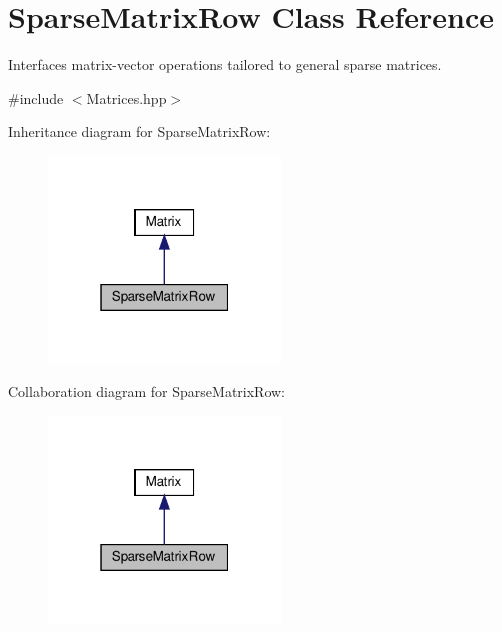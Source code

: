 \hypertarget{class_sparse_matrix_row}{}\section{Sparse\+Matrix\+Row Class Reference}
\label{class_sparse_matrix_row}


Interfaces matrix-\/vector operations tailored to general sparse matrices.  




{\ttfamily \#include $<$Matrices.\+hpp$>$}



Inheritance diagram for Sparse\+Matrix\+Row\+:
\nopagebreak
\begin{figure}[H]
\begin{center}
\leavevmode
\includegraphics[width=175pt]{class_sparse_matrix_row__inherit__graph}
\end{center}
\end{figure}


Collaboration diagram for Sparse\+Matrix\+Row\+:
\nopagebreak
\begin{figure}[H]
\begin{center}
\leavevmode
\includegraphics[width=175pt]{class_sparse_matrix_row__coll__graph}
\end{center}
\end{figure}
